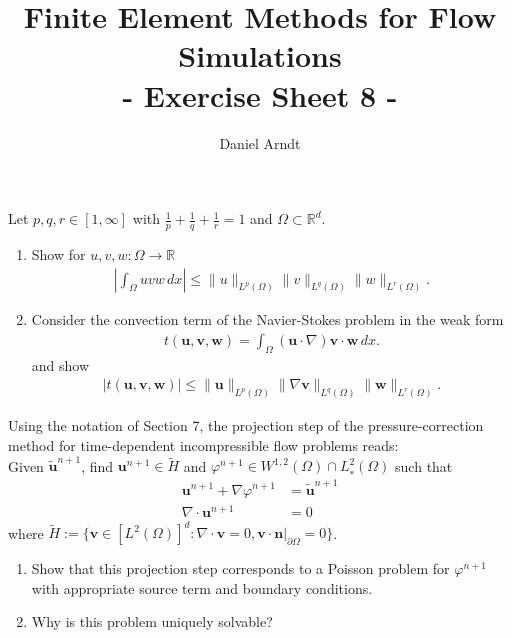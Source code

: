 \documentclass[12pt]{article}
\newcommand{\bu}{\boldsymbol{u}}
\newcommand{\bv}{\boldsymbol{v}}
\newcommand{\bw}{\boldsymbol{w}}
\newenvironment{exercise}[2][Exercise]{\begin{trivlist}
\item[\hskip \labelsep {\bfseries #1}\hskip \labelsep {\bfseries #2.}]}{\end{trivlist}}
\begin{document}
 
\title{Finite Element Methods for Flow Simulations\\ - Exercise Sheet 8 -}
\author{Daniel Arndt}
\date{}
\maketitle

\begin{exercise}{14}
Let $p, q, r \in [1, \infty]$ with $\frac{1}{p}+\frac{1}{q}+\frac{1}{r}=1$ and $\Omega\subset\mathbb{R}^d$.
\begin{enumerate}
\item Show for $u,v,w\colon\Omega\to\mathbb{R}$
\begin{align*}
\left|\int_\Omega u v w \, dx\right|\leq \|u\|_{L^p(\Omega)}\|v\|_{L^q(\Omega)}\|w\|_{L^r(\Omega)}.
\end{align*}

\item Consider the convection term of the Navier-Stokes problem in the weak form
\begin{align*}
t(\bu, \bv, \bw) = \int_\Omega (\bu \cdot \nabla)\bv \cdot \bw \,dx.
\end{align*}
and show
\begin{align*}
|t(\bu, \bv, \bw)| \leq \|\bu\|_{L^p(\Omega)}\|\nabla \bv\|_{L^q(\Omega)} \|\bw\|_{L^r(\Omega)}.
\end{align*}
\end{enumerate}
\end{exercise}

\begin{exercise}{15}
Using the notation of Section 7, the projection step of the pressure-correction method
for time-dependent incompressible flow problems reads:\\
Given $\widetilde{\bu}^{n+1}$, 
find $\bu^{n+1} \in \widetilde{H}$ and $\varphi^{n+1} \in W^{1,2} (\Omega) \cap L^2_∗ (\Omega)$
such that
\begin{align*}
\bu^{n+1} + \nabla\varphi^{n+1} &= \widetilde{\bu}^{n+1}\\
\nabla \cdot \bu^{n+1} &= 0
\end{align*}
where $\widetilde{H} := \{\bv \in [L^2(\Omega)]^d : \nabla \cdot \bv = 0, \bv \cdot \boldsymbol{n}|_{\partial\Omega} = 0\}$.
\begin{enumerate}
\item Show that this projection step corresponds to a Poisson problem for $\varphi^{n+1}$ with appropriate source
term and boundary conditions.
\item Why is this problem uniquely solvable?
\end{enumerate}
\end{exercise}
\end{document}
